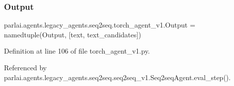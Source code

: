\subsubsection{\texorpdfstring{Output}{Output}}
{\footnotesize\ttfamily parlai.\+agents.\+legacy\+\_\+agents.\+seq2seq.\+torch\+\_\+agent\+\_\+v1.\+Output = namedtuple(\textquotesingle{}Output\textquotesingle{}, \mbox{[}\textquotesingle{}text\textquotesingle{}, \textquotesingle{}text\+\_\+candidates\textquotesingle{}\mbox{]})}



Definition at line 106 of file torch\+\_\+agent\+\_\+v1.\+py.



Referenced by parlai.\+agents.\+legacy\+\_\+agents.\+seq2seq.\+seq2seq\+\_\+v1.\+Seq2seq\+Agent.\+eval\+\_\+step().


